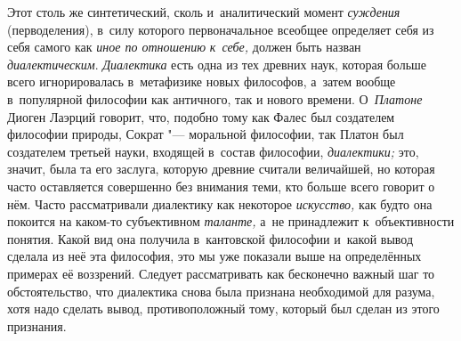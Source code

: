 Этот столь же синтетический, сколь и~аналитический момент {\em суждения}
(перводеления), в~силу которого первоначальное всеобщее
определяет себя из себя самого как
{\em иное по отношению} {\em к~себе,} должен быть
назван {\em диалектическим}. {\em Диалектика} есть одна
из тех древних наук, которая больше всего игнорировалась в~метафизике новых
философов, а~затем вообще в~популярной философии как античного, так и
нового времени. О~{\em Платоне}
Диоген Лаэрций говорит, что, подобно тому как Фалес был
создателем философии природы, Сократ "--- моральной философии,
так Платон был создателем третьей науки, входящей в~состав философии,
{\em диалектики;} это,
значит, была та его заслуга, которую древние считали величайшей, но которая
часто оставляется совершенно без внимания теми, кто больше всего говорит о
нём. Часто рассматривали диалектику как некоторое {\em искусство,} как
будто она покоится на каком-то субъективном {\em таланте,} а~не
принадлежит к~объективности понятия. Какой вид она получила в~кантовской
философии и~какой вывод сделала из неё эта философия, это мы уже показали
выше на определённых примерах её воззрений. Следует рассматривать как
бесконечно важный шаг то обстоятельство, что диалектика снова была признана
необходимой для разума, хотя надо сделать вывод, противоположный тому,
который был сделан из этого признания.

